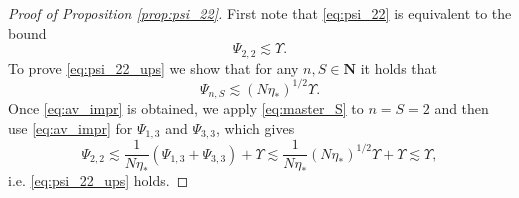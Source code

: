 \documentclass[10pt]{amsart}
\numberwithin{equation}{section}
\newcommand{\N}{\mathbf{N}}
\begin{document}
\begin{proof}[Proof of Proposition \ref{prop:psi_22}] First note that \eqref{eq:psi_22} is equivalent to the bound
\begin{equation}
\Psi_{2,2} \lesssim \Upsilon.
\label{eq:psi_22_ups}
\end{equation}
To prove \eqref{eq:psi_22_ups} we show that for any $n,S\in\N$ it holds that
\begin{equation}
\Psi_{n,S}\lesssim (N\eta_*)^{1/2}\Upsilon.
\label{eq:av_impr}
\end{equation}
Once \eqref{eq:av_impr} is obtained, we apply \eqref{eq:master_S} to $n=S=2$ and then use \eqref{eq:av_impr} for $\Psi_{1,3}$ and $\Psi_{3,3}$, which gives
\begin{equation}
\Psi_{2,2}\lesssim \frac{1}{N\eta_*} \left(\Psi_{1,3}+\Psi_{3,3}\right) + \Upsilon \lesssim \frac{1}{N\eta_*} (N\eta_*)^{1/2}\Upsilon +\Upsilon \lesssim \Upsilon,
\end{equation} 
i.e. \eqref{eq:psi_22_ups} holds.


\end{proof}
\end{document}
